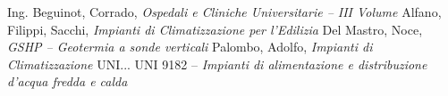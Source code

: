 \begin{thebibliography}{9}
	Ing. Beguinot, Corrado, \emph{Ospedali e Cliniche Universitarie -- III Volume}
	Alfano, Filippi, Sacchi, \emph{Impianti di Climatizzazione per l'Edilizia}
	Del Mastro, Noce, \emph{GSHP -- Geotermia a sonde verticali}
	Palombo, Adolfo, \emph{Impianti di Climatizzazione}
	 UNI...
	 UNI 9182 -- \emph{Impianti di alimentazione e distribuzione d'acqua fredda e calda}
\end{thebibliography}